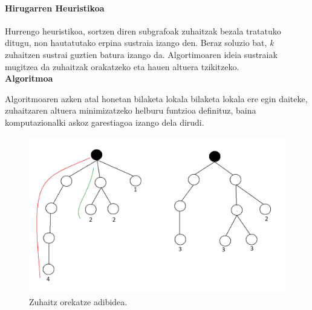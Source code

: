 \documentclass[eu,gi]{ifirak}\usepackage[]{graphicx}\usepackage[]{color}
\begin{document}
\paragraph{Hirugarren Heuristikoa}
Hurrengo heuristikoa, sortzen diren subgrafoak zuhaitzak bezala tratatuko ditugu, non hautatutako erpina sustraia izango den. Beraz soluzio bat, \textit{k} zuhaitzen sustrai guztien batura izango da. Algortimoaren ideia sustraiak mugitzea da zuhaitzak orakatzeko eta hauen altuera tzikitzeko.\\

\textbf{Algoritmoa}\\
\vspace*{0.5cm}

Algoritmoaren azken atal honetan bilaketa lokala bilaketa lokala ere egin daiteke, zuhaitzaren altuera minimizatzeko helburu funtzioa definituz, baina komputazionalki askoz garestiagoa izango dela dirudi.

\begin{figure}[htbp]
    \includegraphics[scale=0.3]{pruebaArbol.png}
    \caption{Zuhaitz orekatze adibidea.}
    \label{fig:adibideHeur}
\end{figure}
\end{document}
